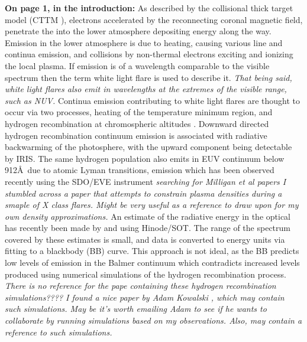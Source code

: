 \documentclass[11pt]{article}
\begin{document}
\textbf{On page 1, in the introduction: } As described by the collisional thick target model (CTTM \cite{1971SoPh...18..489B}), electrons accelerated by the reconnecting coronal magnetic field, penetrate the into the lower atmosphere depositing energy along the way. Emission in the lower atmosphere is due to heating, causing various line and continua emission, and collisions by non-thermal electrons exciting and ionizing the local plasma. If emission is of a wavelength comparable to the visible spectrum then the term white light flare is used to describe it. \emph{That being said, white light flares also emit in wavelengths at the extremes of the visible range, such as NUV.} Continua emission contributing to white light flares are thought to occur via two processes, heating of the temperature minimum region, and hydrogen recombination at chromospheric altitudes \cite{2007ASPC..368..417D}. Downward directed hydrogen recombination continuum emission is associated with radiative backwarming of the photosphere, with the upward component being detectable by IRIS. The same hydrogen population also emits in EUV continuum below 912\AA\ due to atomic Lyman transitions, emission which has been observed recently using the SDO/EVE instrument \citep{2012ApJ...748L..14M, 2014ApJ...793...70M} \emph{searching for Milligan et al papers I stumbled across a paper that attempts to constrain plasma densities during a smaple of X class flares. Might be very useful as a reference to draw upon for my own density approximations.} An estimate of the radiative energy in the optical has recently been made by \cite{2013ApJ...776..123W, 2014ApJ...783...98K} and \cite{2014ApJ...793...70M} using Hinode/SOT. The range of the spectrum covered by these estimates is small, and data is converted to energy units via fitting to a blackbody (BB) curve. This approach is not ideal, as the BB predicts low levels of emission in the Balmer continuum which contradicts increased levels produced using numerical simulations of the hydrogen recombination process. \emph{There is no reference for the pape containing these hydrogen recombination simulations???? I found a nice paper by Adam Kowalski \cite{2015SoPh..tmp...61K}, which may contain such simulations. May be it's worth emailing Adam to see if he wants to collaborate by running simulations based on my observations. Also, \cite{2014ApJ...793...70M} may contain a reference to such simulations.}








\label{Bibliography}
%
\end{document}
